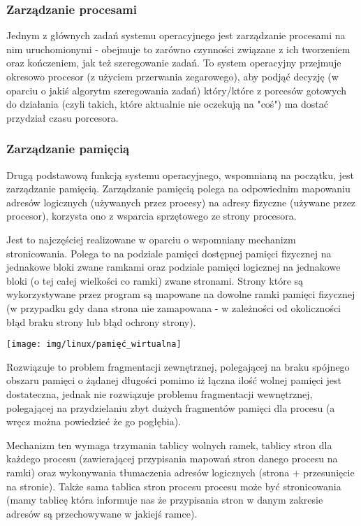 \subsubsection{Zarządzanie procesami}

Jednym z głównych zadań systemu operacyjnego jest zarządzanie procesami na nim uruchomionymi - obejmuje to zarówno czynności związane z ich tworzeniem oraz kończeniem, jak też szeregowanie zadań. To system operacyjny przejmuje okresowo procesor (z użyciem przerwania zegarowego), aby podjąć decyzję (w oparciu o jakiś algorytm szeregowania zadań) który/które z porcesów gotowych do działania (czyli takich, które aktualnie nie oczekują na "coś") ma dostać przydział czasu porcesora.

\subsubsection{Zarządzanie pamięcią}

Drugą podstawową funkcją systemu operacyjnego, wspomnianą na początku, jest zarządzanie pamięcią. Zarządzanie pamięcią polega na odpowiednim mapowaniu adresów logicznych (używanych przez procesy) na adresy fizyczne (używane przez procesor), korzysta ono z wsparcia sprzętowego ze strony procesora.

Jest to najczęściej realizowane w oparciu o wspomniany mechanizm stronicowania. Polega to na podziale pamięci dostępnej pamięci fizycznej na jednakowe bloki zwane ramkami oraz podziale pamięci logicznej na jednakowe bloki (o tej całej wielkości co ramki) zwane stronami. Strony które są wykorzystywane przez program są mapowane na dowolne ramki pamięci fizycznej (w przypadku gdy dana strona nie zamapowana - w zależności od okoliczności błąd braku strony lub błąd ochrony strony).

\begin{center}\texttt{[image: img/linux/pamięć\_wirtualna]}\end{center}

Rozwiązuje to problem fragmentacji zewnętrznej, polegającej na braku spójnego obszaru pamięci o żądanej długości pomimo iż łączna ilość wolnej pamięci jest dostateczna, jednak nie rozwiązuje problemu fragmentacji wewnętrznej, polegającej na przydzielaniu zbyt dużych fragmentów pamięci dla procesu (a wręcz można powiedzieć że go pogłębia).

Mechanizm ten wymaga trzymania tablicy wolnych ramek, tablicy stron dla każdego procesu (zawierającej przypisania mapowań stron danego procesu na ramki) oraz wykonywania tłumaczenia adresów logicznych (strona + przesunięcie na stronie). Także sama tablica stron procesu procesu może być stronicowania (mamy tablicę która informuje nas że przypisania stron w danym zakresie adresów są przechowywane w jakiejś ramce).

